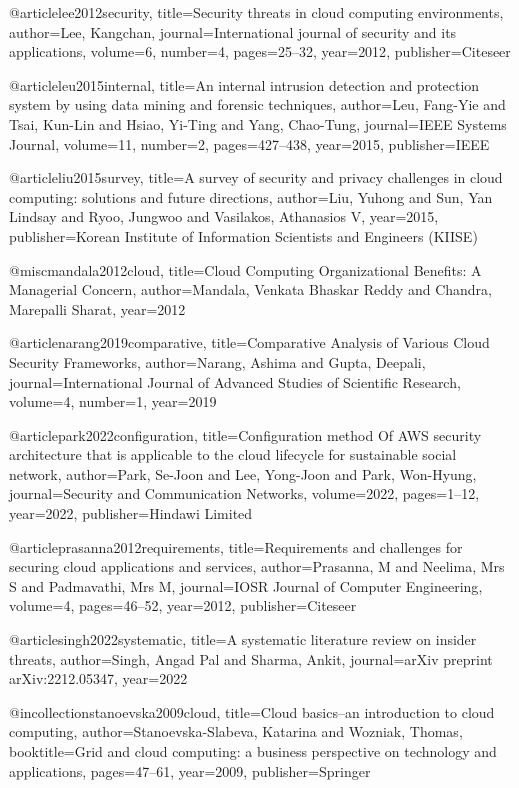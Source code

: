 @article{lee2012security,
title={Security threats in cloud computing environments},
author={Lee, Kangchan},
journal={International journal of security and its applications},
volume={6},
number={4},
pages={25--32},
year={2012},
publisher={Citeseer}
}

@article{leu2015internal,
title={An internal intrusion detection and protection system by using data mining and forensic techniques},
author={Leu, Fang-Yie and Tsai, Kun-Lin and Hsiao, Yi-Ting and Yang, Chao-Tung},
journal={IEEE Systems Journal},
volume={11},
number={2},
pages={427--438},
year={2015},
publisher={IEEE}
}

@article{liu2015survey,
title={A survey of security and privacy challenges in cloud computing: solutions and future directions},
author={Liu, Yuhong and Sun, Yan Lindsay and Ryoo, Jungwoo and Vasilakos, Athanasios V},
year={2015},
publisher={Korean Institute of Information Scientists and Engineers (KIISE)}
}

@misc{mandala2012cloud,
title={Cloud Computing Organizational Benefits: A Managerial Concern},
author={Mandala, Venkata Bhaskar Reddy and Chandra, Marepalli Sharat},
year={2012}
}

@article{narang2019comparative,
title={Comparative Analysis of Various Cloud Security Frameworks},
author={Narang, Ashima and Gupta, Deepali},
journal={International Journal of Advanced Studies of Scientific Research},
volume={4},
number={1},
year={2019}
}

@article{park2022configuration,
title={Configuration method Of AWS security architecture that is applicable to the cloud lifecycle for sustainable social network},
author={Park, Se-Joon and Lee, Yong-Joon and Park, Won-Hyung},
journal={Security and Communication Networks},
volume={2022},
pages={1--12},
year={2022},
publisher={Hindawi Limited}
}

@article{prasanna2012requirements,
title={Requirements and challenges for securing cloud applications and services},
author={Prasanna, M and Neelima, Mrs S and Padmavathi, Mrs M},
journal={IOSR Journal of Computer Engineering},
volume={4},
pages={46--52},
year={2012},
publisher={Citeseer}
}

@article{singh2022systematic,
title={A systematic literature review on insider threats},
author={Singh, Angad Pal and Sharma, Ankit},
journal={arXiv preprint arXiv:2212.05347},
year={2022}
}

@incollection{stanoevska2009cloud,
title={Cloud basics--an introduction to cloud computing},
author={Stanoevska-Slabeva, Katarina and Wozniak, Thomas},
booktitle={Grid and cloud computing: a business perspective on technology and applications},
pages={47--61},
year={2009},
publisher={Springer}
}

